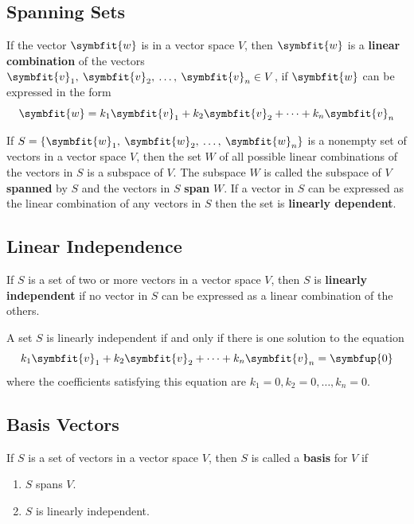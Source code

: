 \documentclass{article}
\begin{document}
\subsection{Spanning Sets}
\begin{definition}
    If the vector \(\symbfit{w}\) is in a vector space \(V\), then
    \(\symbfit{w}\) is a \textbf{linear combination} of the vectors
    \(\symbfit{v}_1,\: \symbfit{v}_2,\: \dots,\: \symbfit{v}_n \in V\),
    if \(\symbfit{w}\) can be expressed in the form
    \begin{equation*}
        \symbfit{w} = k_1 \symbfit{v}_1 + k_2 \symbfit{v}_2 + \cdots + k_n \symbfit{v}_n
    \end{equation*}
\end{definition}
\begin{theorem}
    If \(S=\left\{ \symbfit{w}_1,\: \symbfit{w}_2,\: \dots,\: \symbfit{w}_n \right\}\)
    is a nonempty set of vectors in a vector space \(V\), then the set
    \(W\) of all possible linear combinations of the vectors in \(S\) is
    a subspace of \(V\). The subspace \(W\) is called the subspace of
    \(V\) \textbf{spanned} by \(S\) and the vectors in \(S\)
    \textbf{span} \(W\). If a vector in \(S\) can be expressed as the
    linear combination of any vectors in \(S\) then the set is
    \textbf{linearly dependent}.
\end{theorem}
\subsection{Linear Independence}
\begin{definition}
    If \(S\) is a set of two or more vectors in a vector space \(V\),
    then \(S\) is \textbf{linearly independent} if no vector in \(S\)
    can be expressed as a linear combination of the others.
\end{definition}
\begin{theorem}
    A set \(S\) is linearly independent if and only if there is one
    solution to the equation
    \begin{equation*}
        k_1 \symbfit{v}_1 + k_2 \symbfit{v}_2 + \cdots + k_n \symbfit{v}_n = \symbfup{0}
    \end{equation*}
    where the coefficients satisfying this equation are
    \(k_1=0, k_2=0, \dots, k_n=0\).
\end{theorem}
\subsection{Basis Vectors}
\begin{definition}
    If \(S\) is a set of vectors in a vector space \(V\), then \(S\) is
    called a \textbf{basis} for \(V\) if
    \begin{enumerate}
        \item \(S\) spans \(V\).
        \item \(S\) is linearly independent.
    \end{enumerate}
\end{definition}
\end{document}

